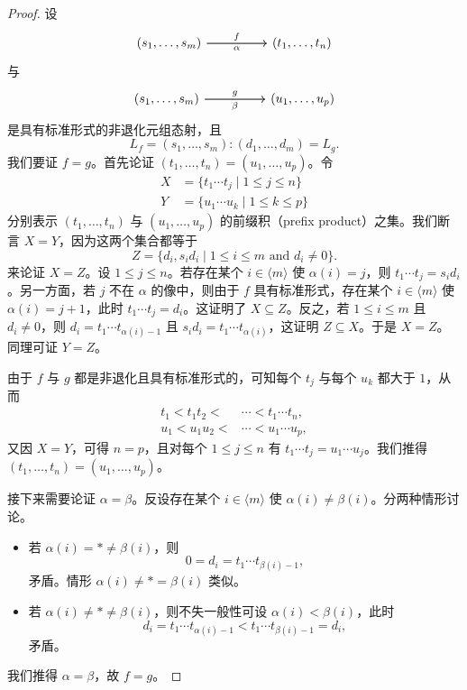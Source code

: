 \begin{proof}
    设
    \[\begin{tikzcd}
        (s_1,\dots,s_m) \ar[rr,"f"] \ar[rr,swap,"\alpha"] & & (t_1,\dots,t_n)
    \end{tikzcd}
    \]
    与
    \[\begin{tikzcd}
        (s_1,\dots,s_m) \ar[rr,"g"] \ar[rr,swap,"\beta"] & & (u_1,\dots,u_p)
    \end{tikzcd}
    \]
    是具有标准形式的非退化元组态射，且
    \[
    L_f = (s_1,\dots,s_m):(d_1,\dots,d_m) = L_g.
    \]
    我们要证 $f = g$。首先论证 $(t_1,\dots,t_n) = (u_1,\dots,u_p)$。令
    \begin{align*}
    X & = \{ t_1 \cdots t_j \mid 1 \leq j \leq n\}\\
    Y & = \{u_1\cdots u_k \mid 1 \leq k \leq p\}
    \end{align*}
    分别表示 $(t_1,\dots,t_n)$ 与 $(u_1,\dots,u_p)$ 的前缀积（prefix product）之集。我们断言 $X = Y$，因为这两个集合都等于
    \[
    Z = \{d_i, s_id_i \mid 1 \leq i \leq m \text{ and }d_i \neq 0\}.
    \]
    来论证 $X = Z$。设 $1 \leq j \leq n$。若存在某个 $i \in \langle m \rangle$ 使 $\alpha(i) = j$，则 $t_1 \cdots t_j = s_id_i$。另一方面，若 $j$ 不在 $\alpha$ 的像中，则由于 $f$ 具有标准形式，存在某个 $i \in \langle m \rangle$ 使 $\alpha(i) = j+1$，此时 $t_1 \cdots t_j = d_i$。这证明了 $X \subseteq Z$。反之，若 $1 \leq i \leq m$ 且 $d_i \neq 0$，则 $d_i = t_1 \cdots t_{\alpha(i)-1}$ 且 $s_id_i = t_1 \cdots t_{\alpha(i)}$，这证明 $Z \subseteq X$。于是 $X = Z$。同理可证 $Y = Z$。


    由于 $f$ 与 $g$ 都是非退化且具有标准形式的，可知每个 $t_j$ 与每个 $u_k$ 都大于 $1$，从而
    \begin{align*}
    t_1  < t_1t_2 < & \cdots < t_1\cdots t_n,\\
    u_1  < u_1u_2 < & \cdots < u_1\cdots u_p,
    \end{align*}
    又因 $X = Y$，可得 $n = p$，且对每个 $1 \leq j \leq n$ 有 $t_1 \cdots t_j = u_1 \cdots u_j$。我们推得 $(t_1,\dots,t_n) = (u_1,\dots,u_p)$。

    接下来需要论证 $\alpha = \beta$。反设存在某个 $i \in \langle m \rangle$ 使 $\alpha(i) \neq \beta(i)$。分两种情形讨论。
    \begin{itemize}
        \item 若 $\alpha(i) = * \neq \beta(i)$，则
        \[
        0 = d_i = t_1 \cdots t_{\beta(i)-1},
        \]
        矛盾。情形 $\alpha(i) \neq * = \beta(i)$ 类似。
        \item 若 $\alpha(i) \neq * \neq \beta(i)$，则不失一般性可设 $\alpha(i) < \beta(i)$，此时
        \[
        d_i = t_1 \cdots t_{\alpha(i)-1} < t_1 \cdots t_{\beta(i)-1} = d_i,
        \]
        矛盾。
    \end{itemize}
    我们推得 $\alpha = \beta$，故 $f = g$。
\end{proof}

